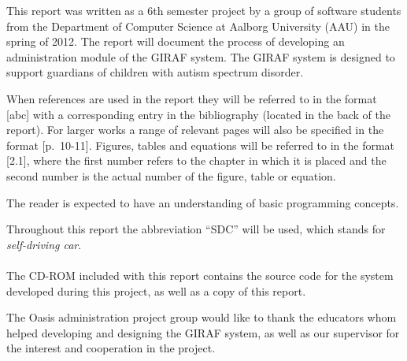 This report was written as a 6th semester project by a group of software students from the Department of Computer Science at Aalborg University (AAU) in the spring of 2012. The report will document the process of developing an administration module of the GIRAF system. The GIRAF system is designed to support guardians of children with autism spectrum disorder.

When references are used in the report they will be referred to in the format [abc] with a corresponding entry in the bibliography (located in the back of the report). For larger works a range of relevant pages will also be specified in the format [p.~10-11]. Figures, tables and equations will be referred to in the format [2.1], where the first number refers to the chapter in which it is placed and the second number is the actual number of the figure, table or equation.

The reader is expected to have an understanding of basic programming concepts.

Throughout this report the abbreviation ``SDC'' will be used, which stands for \emph{self-driving car}.
\\ \\
The CD-ROM included with this report contains the source code for the system developed during this project, as well as a copy of this report.

The Oasis administration project group would like to thank the educators whom helped developing and designing the GIRAF system, as well as our supervisor for the interest and cooperation in the project.